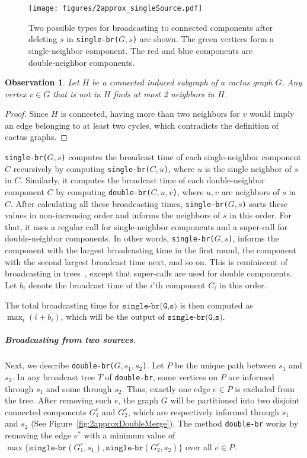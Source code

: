 \documentclass[letterpaper,11pt]{article}
\newtheorem{observation}{Observation}[section]
\newcommand{\singlefunc}[1]{\texttt{single-br(#1)}\xspace}
\newcommand{\doublefunc}[1]{\texttt{double-br(#1)}\xspace}
\newcommand{\singlefuncc}{\texttt{single-br}\xspace}
\newcommand{\doublefuncc}{\texttt{double-br}\xspace}
\newcommand{\figcomponent}{
    \begin{figure}
	\centering
	\texttt{[image: figures/2approx\_singleSource.pdf]}
	\caption{Two possible types for broadcasting to connected components after deleting $s$ in \singlefunc{$G,s$} are shown. The green vertices form a single-neighbor component. The red and blue components are double-neighbor components.}
    \label{fig:2approxSingleSource}

\end{figure}
}
\begin{document}
\figcomponent

\begin{observation}
\label{observation:two-neighbors}
Let $H$ be a connected induced subgraph of a cactus graph $G$. Any vertex $v \in G$ that is not in $H$ finds at most 2 neighbors in $H$.
\end{observation}
\begin{proof}
    Since $H$ is connected, having more than two neighbors for $v$ would imply an edge belonging to at least two cycles, which contradicts the definition of cactus graphs. 
\end{proof}

\singlefunc{$G,s$} computes the broadcast time of each single-neighbor component $C$ 
recursively by computing \singlefunc{$C, u$}, where $u$ is the single neighbor of $s$ in $C$. Similarly, it computes the broadcast time of each double-neighbor component $C$ by computing 
\doublefunc{$C, u, v$}, where $u, v$ are neighbors of $s$ in $C$. 
After calculating all these broadcasting times, \singlefunc{$G,s$} sorts these values in non-increasing order and informs the neighbors of $s$ in this order. For that, it uses a regular call for single-neighbor components and a super-call for double-neighbor components. 
In other words, \singlefunc{$G,s$},  informs 
the component with the largest broadcasting time in the first round, the component with the second largest broadcast time next, and so on. This is reminiscent of broadcasting in trees~\cite{fraigniaud2002polynomial}, except that super-calls are used for double components. Let $b_i$ denote the broadcast time of the $i$'th component $C_i$ in this order. 

The total broadcasting time for $\singlefunc{G,s}$ is then computed as $\max_i (i+b_i)$, which will be the output of $\singlefunc{G,s}$. 


\subparagraph*{Broadcasting from two sources.} Next, we describe \doublefunc{$G, s_1, s_2$}. 
Let $P$ be the unique path between $s_1$ and $s_2$.
In any broadcast tree $T$ of
\doublefuncc, some vertices on $P$ are informed through $s_1$ and some through $s_2$. Thus, 
exactly one edge $e \in P$ is excluded from the tree. 
After removing such $e$, the graph $G$ will be partitioned into two disjoint connected components $G_1^{e}$ and $G_2^{e}$, which are respectively informed through $s_1$ and $s_2$ (See Figure~\ref{fig:2approxDoubleMerge}). 
The method \doublefuncc works by removing the edge $e^*$
with a minimum value of 
\linebreak $\max \{ \singlefuncc (G_1^{e},s_1), \singlefuncc (G_2^{e},s_2) \}$ 
over all $e\in P$. 
\end{document}
